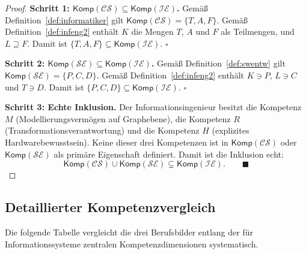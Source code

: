 ﻿\documentclass[a4paper,12pt]{article}
\theoremstyle{definition}
\begin{document}
\begin{proof}
\textbf{Schritt 1: $\mathsf{Komp}(\mathcal{CS}) \subseteq \mathsf{Komp}(\mathcal{IE})$.}
Gemäß Definition~\ref{def:informatiker} gilt
$\mathsf{Komp}(\mathcal{CS}) = \{T, A, F\}$.
Gemäß Definition~\ref{def:infeng2} enthält $K$ die Mengen $T$, $A$ und $F$ als Teilmengen,
und $L \supseteq F$. Damit ist $\{T, A, F\} \subseteq \mathsf{Komp}(\mathcal{IE})$. $\square$

\textbf{Schritt 2: $\mathsf{Komp}(\mathcal{SE}) \subseteq \mathsf{Komp}(\mathcal{IE})$.}
Gemäß Definition~\ref{def:swentw} gilt
$\mathsf{Komp}(\mathcal{SE}) = \{P, C, D\}$.
Gemäß Definition~\ref{def:infeng2} enthält $K \ni P$, $L \ni C$ und $T \ni D$.
Damit ist $\{P, C, D\} \subseteq \mathsf{Komp}(\mathcal{IE})$. $\square$

\textbf{Schritt 3: Echte Inklusion.}
Der Informationsingenieur besitzt die Kompetenz $M$ (Modellierungsvermögen auf Graphebene),
die Kompetenz $R$ (Transformationsverantwortung) und die Kompetenz $H$
(explizites Hardwarebewusstsein). Keine dieser drei Kompetenzen ist in
$\mathsf{Komp}(\mathcal{CS})$ oder $\mathsf{Komp}(\mathcal{SE})$ als primäre Eigenschaft
definiert. Damit ist die Inklusion echt:
\[
  \mathsf{Komp}(\mathcal{CS}) \cup \mathsf{Komp}(\mathcal{SE}) \subsetneq \mathsf{Komp}(\mathcal{IE}).
  \qquad \blacksquare
\]
\end{proof}

\subsection{Detaillierter Kompetenzvergleich}

Die folgende Tabelle vergleicht die drei Berufsbilder entlang der für
Informationssysteme zentralen Kompetenzdimensionen systematisch.
\end{document}
